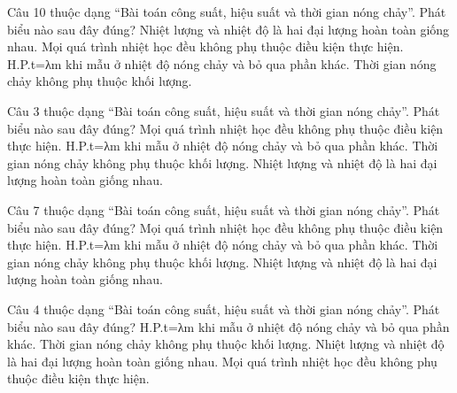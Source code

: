 \begin{ex}
Câu 10 thuộc dạng “Bài toán công suất, hiệu suất và thời gian nóng chảy”. Phát biểu nào sau đây đúng?
\choice
{Nhiệt lượng và nhiệt độ là hai đại lượng hoàn toàn giống nhau.}
{Mọi quá trình nhiệt học đều không phụ thuộc điều kiện thực hiện.}
{\True H.P.t=λm khi mẫu ở nhiệt độ nóng chảy và bỏ qua phần khác.}
{Thời gian nóng chảy không phụ thuộc khối lượng.}
\end{ex}

\begin{ex}
Câu 3 thuộc dạng “Bài toán công suất, hiệu suất và thời gian nóng chảy”. Phát biểu nào sau đây đúng?
\choice
{Mọi quá trình nhiệt học đều không phụ thuộc điều kiện thực hiện.}
{\True H.P.t=λm khi mẫu ở nhiệt độ nóng chảy và bỏ qua phần khác.}
{Thời gian nóng chảy không phụ thuộc khối lượng.}
{Nhiệt lượng và nhiệt độ là hai đại lượng hoàn toàn giống nhau.}
\end{ex}

\begin{ex}
Câu 7 thuộc dạng “Bài toán công suất, hiệu suất và thời gian nóng chảy”. Phát biểu nào sau đây đúng?
\choice
{Mọi quá trình nhiệt học đều không phụ thuộc điều kiện thực hiện.}
{\True H.P.t=λm khi mẫu ở nhiệt độ nóng chảy và bỏ qua phần khác.}
{Thời gian nóng chảy không phụ thuộc khối lượng.}
{Nhiệt lượng và nhiệt độ là hai đại lượng hoàn toàn giống nhau.}
\end{ex}

\begin{ex}
Câu 4 thuộc dạng “Bài toán công suất, hiệu suất và thời gian nóng chảy”. Phát biểu nào sau đây đúng?
\choice
{\True H.P.t=λm khi mẫu ở nhiệt độ nóng chảy và bỏ qua phần khác.}
{Thời gian nóng chảy không phụ thuộc khối lượng.}
{Nhiệt lượng và nhiệt độ là hai đại lượng hoàn toàn giống nhau.}
{Mọi quá trình nhiệt học đều không phụ thuộc điều kiện thực hiện.}
\end{ex}

